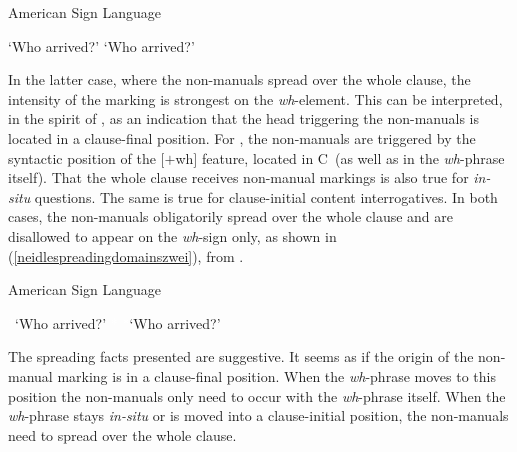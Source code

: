 \begin{exe}
\ex American Sign Language \citep[76]{neidle2002language}\label{neidlespreadingdomains}
\begin{xlist}
\ex {} 
\glt `Who arrived?' \label{ex:neidlespreadingdomainsa}
\ex {}
\glt `Who arrived?' \label{ex:neidlespreadingdomainsb}
\end{xlist}
\end{exe}

\noindent In the latter case, where the non-manuals spread over the whole clause, the intensity of the marking is strongest on the \textit{wh}-element. This can be interpreted, in the spirit of \citet{bahan1996}, as an indication that the head triggering the non-manuals is located in a clause-final position. For \citet{neidle2002language}, the non-manuals are triggered by the syntactic position of the $[+$wh$]$ feature, located in C\textdegree\ (as well as in the \textit{wh}-phrase itself). That the whole clause receives non-manual markings is also true for \textit{in-situ} questions. The same is true for clause-initial content interrogatives. In both cases, the non-manuals obligatorily spread over the whole clause and are disallowed to appear on the \textit{wh}-sign only, as shown in (\ref{neidlespreadingdomainszwei}), from \citet[77]{neidle2002language}.

\begin{exe}
\ex American Sign Language \citep[77]{neidle2002language}\label{neidlespreadingdomainszwei}\begin{xlist}
\ex * 
\glt \textcolor{white}{*}`Who arrived?' \label{ex:neidlespreadingdomainszweia}
\ex\textcolor{white}{*}
\glt \textcolor{white}{*}`Who arrived?' \label{ex:neidlespreadingdomainszweib}
\end{xlist}
\end{exe}

\noindent The spreading facts presented are suggestive. It seems as if the origin of the non-manual marking is in a clause-final position. When the \textit{wh}-phrase moves to this position the non-manuals only need to occur with the \textit{wh}-phrase itself. When the \textit{wh}-phrase stays \textit{in-situ} or is moved into a clause-initial position, the non-manuals need to spread over the whole clause.

